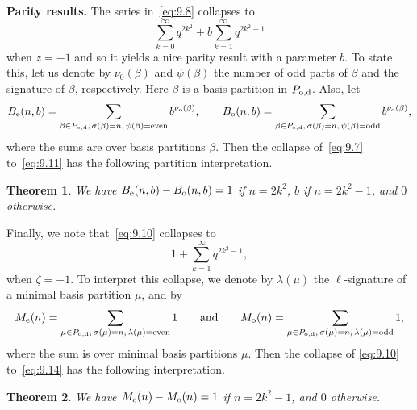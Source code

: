 \documentclass[10pt,a4paper]{amsart}
\numberwithin{equation}{section}
\newtheorem{Theorem}{Theorem}[section]
\theoremstyle{definition}
\begin{document}
{\bf Parity results.}
The series in~\eqref{eq:9.8} collapses to
\begin{equation}
\sum^{\infty}_{k=0}q^{2k^2}+b\sum^{\infty}_{k=1}q^{2k^2-1}\label{eq:9.11}
\end{equation}
when $z=-1$ and so it yields a nice parity result with a parameter $b$.
To state this, let us denote by $\nu_0(\beta)$ and $\psi(\beta)$ the number
of odd parts of $\beta$ and the signature of $\beta$, respectively. Here
$\beta$ is a basis partition in $P_{\rm o,d}$. Also, let
\begin{equation*}
B_{\rm e}(n,b)=\sum_{\beta\in P_{\rm o,d},\, \sigma(\beta)=n,\, \psi(\beta)= {\rm even}}b^{\nu_{\rm o}(\beta)},%
\qquad
B_{\rm o}(n,b)=\sum_{\beta\in P_{\rm o,d},\, \sigma(\beta)=n, \, \psi(\beta)={\rm odd}}b^{\nu_{\rm o}(\beta)},%
\end{equation*}
where the sums are over basis partitions $\beta$. Then the collapse of~\eqref{eq:9.7}
to~\eqref{eq:9.11} has the following partition interpretation.

\begin{Theorem}
We have $B_{\rm e}(n,b)-B_{\rm o}(n,b)= 1$ if $n=2k^2$, $b$ if $n=2k^2-1$, and $0$ otherwise.
\end{Theorem}

Finally, we note that~\eqref{eq:9.10} collapses to
\begin{equation}
1+\sum^{\infty}_{k=1}q^{2k^2-1},\label{eq:9.14}
\end{equation}
when $\zeta=-1$. To interpret this collapse, we denote by $\lambda(\mu)$
the $\ell$-signature of a minimal basis partition $\mu$, and by
\begin{equation*}
M_{\rm e}(n)=\sum_{\mu\in P_{\rm o,d},\, \sigma(\mu)=n, \,\lambda(\mu)= {\rm even}}1 %
\qquad \text{and}\qquad
M_{\rm o}(n)=\sum_{\mu\in P_{\rm o,d},\, \sigma(\mu)=n, \, \lambda(\mu)= {\rm odd}} 1,%
\end{equation*}
where the sum is over minimal basis partitions $\mu$. Then the collapse of
\eqref{eq:9.10} to~\eqref{eq:9.14} has the following interpretation.

\begin{Theorem}%
We have $M_{\rm e}(n)-M_{\rm o}(n)= 1$ if $n=2k^2-1$, and $0$ otherwise.
\end{Theorem}
\end{document}
